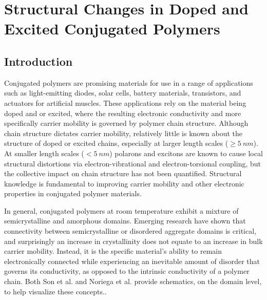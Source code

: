 %
\chapter{Structural Changes in Doped and Excited Conjugated Polymers}

\section{Introduction}

Conjugated polymers are promising materials for use in a range of applications such as light-emitting diodes, solar cells, battery materials, transistors, and actuators for artificial muscles.\cite{Swager2017} These applications rely on the material being doped and or excited, where the resulting electronic conductivity and more specifically carrier mobility is governed by polymer chain structure.\cite{Noriega2013a, Noriega2013} Although chain structure dictates carrier mobility, relatively little is known about the structure of doped or excited chains, especially at larger length scales ($\geq 5 \ nm$). At smaller length scales ($< 5 \ nm$) polarons and excitons are known to cause local structural distortions via electron-vibrational and electron-torsional coupling,\cite{Tapping2014, Zhou2015, Yu2012, Busby2011} but the collective impact on chain structure has not been quantified. Structural knowledge is fundamental to improving carrier mobility and other electronic properties in conjugated polymer materials.\cite{Beaujuge2011, Kuei2017}

In general, conjugated polymers at room temperature exhibit a mixture of semicrystalline and amorphous domains.\cite{Shen2016} Emerging research have shown that connectivity between semicrystalline or disordered aggregate domains is critical, and surprisingly an increase in crystallinity does not equate to an increase in bulk carrier mobility.\cite{Son2016, Noriega2013} Instead, it is the specific material's ability to remain electronically connected while experiencing an inevitable amount of disorder that governs its conductivity,\cite{Noriega2013} as opposed to the intrinsic conductivity of a polymer chain. Both Son et al. and Noriega et al. provide schematics, on the domain level, to help visualize these concepts.\cite{Son2016, Noriega2013}.

